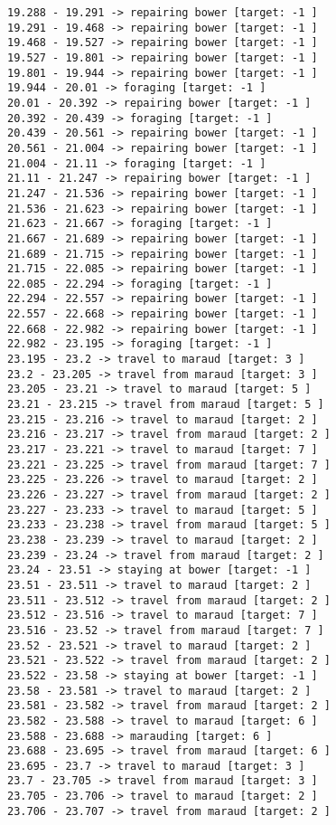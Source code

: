 \documentclass[11pt]{article}
\begin{document}
\begin{Verbatim}[commandchars=\\\{\}]
19.288 - 19.291 -> repairing bower [target: -1 ]
19.291 - 19.468 -> repairing bower [target: -1 ]
19.468 - 19.527 -> repairing bower [target: -1 ]
19.527 - 19.801 -> repairing bower [target: -1 ]
19.801 - 19.944 -> repairing bower [target: -1 ]
19.944 - 20.01 -> foraging [target: -1 ]
20.01 - 20.392 -> repairing bower [target: -1 ]
20.392 - 20.439 -> foraging [target: -1 ]
20.439 - 20.561 -> repairing bower [target: -1 ]
20.561 - 21.004 -> repairing bower [target: -1 ]
21.004 - 21.11 -> foraging [target: -1 ]
21.11 - 21.247 -> repairing bower [target: -1 ]
21.247 - 21.536 -> repairing bower [target: -1 ]
21.536 - 21.623 -> repairing bower [target: -1 ]
21.623 - 21.667 -> foraging [target: -1 ]
21.667 - 21.689 -> repairing bower [target: -1 ]
21.689 - 21.715 -> repairing bower [target: -1 ]
21.715 - 22.085 -> repairing bower [target: -1 ]
22.085 - 22.294 -> foraging [target: -1 ]
22.294 - 22.557 -> repairing bower [target: -1 ]
22.557 - 22.668 -> repairing bower [target: -1 ]
22.668 - 22.982 -> repairing bower [target: -1 ]
22.982 - 23.195 -> foraging [target: -1 ]
23.195 - 23.2 -> travel to maraud [target: 3 ]
23.2 - 23.205 -> travel from maraud [target: 3 ]
23.205 - 23.21 -> travel to maraud [target: 5 ]
23.21 - 23.215 -> travel from maraud [target: 5 ]
23.215 - 23.216 -> travel to maraud [target: 2 ]
23.216 - 23.217 -> travel from maraud [target: 2 ]
23.217 - 23.221 -> travel to maraud [target: 7 ]
23.221 - 23.225 -> travel from maraud [target: 7 ]
23.225 - 23.226 -> travel to maraud [target: 2 ]
23.226 - 23.227 -> travel from maraud [target: 2 ]
23.227 - 23.233 -> travel to maraud [target: 5 ]
23.233 - 23.238 -> travel from maraud [target: 5 ]
23.238 - 23.239 -> travel to maraud [target: 2 ]
23.239 - 23.24 -> travel from maraud [target: 2 ]
23.24 - 23.51 -> staying at bower [target: -1 ]
23.51 - 23.511 -> travel to maraud [target: 2 ]
23.511 - 23.512 -> travel from maraud [target: 2 ]
23.512 - 23.516 -> travel to maraud [target: 7 ]
23.516 - 23.52 -> travel from maraud [target: 7 ]
23.52 - 23.521 -> travel to maraud [target: 2 ]
23.521 - 23.522 -> travel from maraud [target: 2 ]
23.522 - 23.58 -> staying at bower [target: -1 ]
23.58 - 23.581 -> travel to maraud [target: 2 ]
23.581 - 23.582 -> travel from maraud [target: 2 ]
23.582 - 23.588 -> travel to maraud [target: 6 ]
23.588 - 23.688 -> marauding [target: 6 ]
23.688 - 23.695 -> travel from maraud [target: 6 ]
23.695 - 23.7 -> travel to maraud [target: 3 ]
23.7 - 23.705 -> travel from maraud [target: 3 ]
23.705 - 23.706 -> travel to maraud [target: 2 ]
23.706 - 23.707 -> travel from maraud [target: 2 ]

\end{Verbatim}
\end{document}
